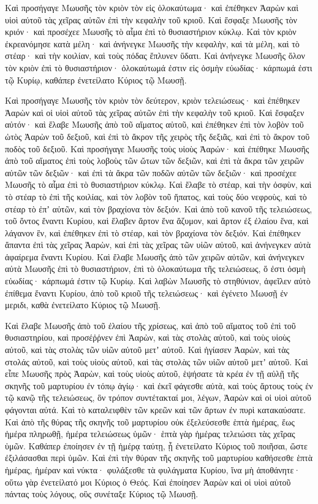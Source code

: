 {Καὶ προσήγαγε Μωυσῆς τὸν κριὸν τὸν εἰς ὁλοκαύτωμα· καὶ ἐπέθηκεν Ἀαρὼν καὶ υἱοὶ αὐτοῦ τὰς χεῖρας αὐτῶν ἐπὶ τὴν κεφαλὴν τοῦ κριοῦ. Καὶ ἔσφαξε Μωυσῆς τὸν κριόν· καὶ προσέχεε Μωυσῆς τὸ αἷμα ἐπὶ τὸ θυσιαστήριον κύκλῳ.
Καὶ τὸν κριὸν ἐκρεανόμησε κατὰ μέλη· καὶ ἀνήνεγκε Μωυσῆς τὴν κεφαλὴν, καὶ τὰ μέλη, καὶ τὸ στέαρ· καὶ τὴν κοιλίαν, καὶ τοὺς πόδας ἔπλυνεν ὕδατι.
Καὶ ἀνήνεγκε Μωυσῆς ὅλον τὸν κριὸν ἐπὶ τὸ θυσιαστήριον· ὁλοκαύτωμά ἐστιν εἰς ὀσμὴν εὐωδίας· κάρπωμά ἐστι τῷ Κυρίῳ, καθάπερ ἐνετείλατο Κύριος τῷ Μωυσῇ.
\par }{\PP {}Καὶ προσήγαγε Μωυσῆς τὸν κριὸν τὸν δεύτερον, κριὸν τελειώσεως· καὶ ἐπέθηκεν Ἀαρὼν καὶ οἱ υἱοὶ αὐτοῦ τὰς χεῖρας αὐτῶν ἐπὶ τὴν κεφαλὴν τοῦ κριοῦ.
Καὶ ἔσφαξεν αὐτόν· καὶ ἔλαβε Μωυσῆς ἀπὸ τοῦ αἵματος αὐτοῦ, καὶ ἐπέθηκεν ἐπὶ τὸν λοβὸν τοῦ ὠτὸς Ἀαρὼν τοῦ δεξιοῦ, καὶ ἐπὶ τὸ ἄκρον τῆς χειρὸς τῆς δεξιᾶς, καὶ ἐπὶ τὸ ἄκρον τοῦ ποδὸς τοῦ δεξιοῦ.
Καὶ προσήγαγε Μωυσῆς τοὺς υἱοὺς Ἀαρών· καὶ ἐπέθηκε Μωυσῆς ἀπὸ τοῦ αἵματος ἐπὶ τοὺς λοβοὺς τῶν ὤτων τῶν δεξιῶν, καὶ ἐπὶ τὰ ἄκρα τῶν χειρῶν αὐτῶν τῶν δεξιῶν· καὶ ἐπὶ τὰ ἄκρα τῶν ποδῶν αὐτῶν τῶν δεξιῶν· καὶ προσέχεε Μωυσῆς τὸ αἷμα ἐπὶ τὸ θυσιαστήριον κύκλῳ.
Καὶ ἔλαβε τὸ στέαρ, καὶ τὴν ὀσφὺν, καὶ τὸ στέαρ τὸ ἐπὶ τῆς κοιλίας, καὶ τὸν λοβὸν τοῦ ἥπατος, καὶ τοὺς δύο νεφροὺς, καὶ τὸ στέαρ τὸ ἐπʼ αὐτῶν, καὶ τὸν βραχίονα τὸν δεξιόν.
Καὶ ἀπὸ τοῦ κανοῦ τῆς τελειώσεως, τοῦ ὄντος ἔναντι Κυρίου, καὶ ἔλαβεν ἄρτον ἕνα ἄζυμον, καὶ ἄρτον ἐξ ἐλαίου ἕνα, καὶ λάγανον ἓν, καὶ ἐπέθηκεν ἐπὶ τὸ στέαρ, καὶ τὸν βραχίονα τὸν δεξιόν.
Καὶ ἐπέθηκεν ἅπαντα ἐπὶ τὰς χεῖρας Ἀαρὼν, καὶ ἐπὶ τὰς χεῖρας τῶν υἱῶν αὐτοῦ, καὶ ἀνήνεγκεν αὐτὰ ἀφαίρεμα ἔναντι Κυρίου.
Καὶ ἔλαβε Μωυσῆς ἀπὸ τῶν χειρῶν αὐτῶν, καὶ ἀνήνεγκεν αὐτὰ Μωυσῆς ἐπὶ τὸ θυσιαστήριον, ἐπὶ τὸ ὁλοκαύτωμα τῆς τελειώσεως, ὅ ἐστι ὀσμὴ εὐωδίας· κάρπωμά ἐστιν τῷ Κυρίῳ.
Καὶ λαβὼν Μωυσῆς τὸ στηθύνιον, ἀφεῖλεν αὐτὸ ἐπίθεμα ἔναντι Κυρίου, ἀπὸ τοῦ κριοῦ τῆς τελειώσεως· καὶ ἐγένετο Μωυσῇ ἐν μεριδι, καθὰ ἐνετείλατο Κύριος τῷ Μωυσῇ.
\par }{\PP {}Καὶ ἔλαβε Μωυσῆς ἀπὸ τοῦ ἐλαίου τῆς χρίσεως, καὶ ἀπὸ τοῦ αἵματος τοῦ ἐπὶ τοῦ θυσιαστηρίου, καὶ προσέῤῥνεν ἐπὶ Ἀαρὼν, καὶ τὰς στολὰς αὐτοῦ, καὶ τοὺς υἱοὺς αὐτοῦ, καὶ τὰς στολὰς τῶν υἱῶν αὐτοῦ μετʼ αὐτοῦ.
Καὶ ἡγίασεν Ἀαρὼν, καὶ τὰς στολάς αὐτοῦ, καὶ τοὺς υἱοὺς αὐτοῦ, καὶ τὰς στολὰς τῶν υἱῶν αὐτοῦ μετʼ αὐτοῦ.
Καὶ εἶπε Μωυσῆς πρὸς Ἀαρὼν, καὶ τοὺς υἱοὺς αὐτοῦ, ἑψήσατε τὰ κρέα ἐν τῇ αὐλῇ τῆς σκηνῆς τοῦ μαρτυρίου ἐν τόπῳ ἁγίῳ· καὶ ἐκεῖ φάγεσθε αὐτὰ, καὶ τοὺς ἄρτους τοὺς ἐν τῷ κανῷ τῆς τελειώσεως, ὃν τρόπον συντέτακταί μοι, λέγων, Ἀαρὼν καὶ οἱ υἱοὶ αὐτοῦ φάγονται αὐτά.
Καὶ τὸ καταλειφθὲν τῶν κρεῶν καὶ τῶν ἄρτων ἐν πυρὶ κατακαύσατε.
Καὶ ἀπὸ τῆς θύρας τῆς σκηνῆς τοῦ μαρτυρίου οὐκ ἐξελεύσεσθε ἑπτὰ ἡμέρας, ἕως ἡμέρα πληρωθῇ, ἡμέρα τελειώσεως ὑμῶν· ἑπτὰ γὰρ ἡμέρας τελειώσει τὰς χεῖρας ὑμῶν.
Καθάπερ ἐποίησεν ἐν τῇ ἡμέρᾳ ταύτῃ, ᾗ ἐνετείλατο Κύριος τοῦ ποιῆσαι, ὥστε ἐξιλάσασθαι περὶ ὑμῶν.
Καὶ ἐπὶ τὴν θύραν τῆς σκηνῆς τοῦ μαρτυρίου καθήσεσθε ἑπτὰ ἡμέρας, ἡμέραν καὶ νύκτα· φυλάξεσθε τὰ φυλάγματα Κυρίου, ἵνα μὴ ἀποθάνητε· οὕτω γὰρ ἐνετείλατό μοι Κύριος ὁ Θεός.
Καὶ ἐποίησεν Ἀαρὼν καὶ οἱ υἱοὶ αὐτοῦ πάντας τοὺς λόγους, οὓς συνέταξε Κύριος τῷ Μωυσῇ.

}
